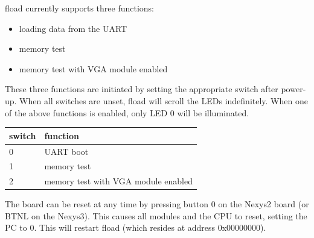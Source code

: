 \documentclass{article}
\begin{document}
fload currently supports three functions:
\begin{itemize}
\item loading data from the UART
\item memory test
\item memory test with VGA module enabled 
\end{itemize}
These three functions are initiated by setting the appropriate switch after power-up. When all switches are unset, fload will scroll the LEDs indefinitely. When one of the above functions is enabled, only LED 0 will be illuminated.
 
\begin{tabular}{ | l | l | }
\hline
switch & function \\
\hline
0 & UART boot \\
1 & memory test \\
2 & memory test with VGA module enabled \\
\hline
\end{tabular}

The board can be reset at any time by pressing button 0 on the Nexys2 board (or BTNL on the Nexys3). This causes all modules and the CPU to reset, setting the PC to 0. This will restart fload (which resides at address 0x00000000). 
\end{document}
